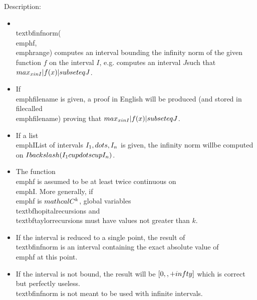 \noindent Description: \begin{itemize}

\item \\textbf{infnorm}(\\emph{f},\\emph{range}) computes an interval bounding the infinity norm of the \n   given function $f$ on the interval $I$, e.g. computes an interval $J$\n   such that $\\max_{x \\in I} \\{|f(x)|\\} \\subseteq J$.\n
\item If \\emph{filename} is given, a proof in English will be produced (and stored in file\n   called \\emph{filename}) proving that  $\\max_{x \\in I} \\{|f(x)|\\} \\subseteq J$.\n
\item If a list \\emph{IList} of intervals $I_1, \\dots, I_n$ is given, the infinity norm will\n   be computed on $I \\backslash (I_1 \\cup \\dots \\cup I_n)$.\n
\item The function \\emph{f} is assumed to be at least twice continuous on \\emph{I}. More \n   generally, if \\emph{f} is $\\mathcal{C}^k$, global variables \\textbf{hopitalrecursions} and\n   \\textbf{taylorrecursions} must have values not greater than $k$.  \n
\item If the interval is reduced to a single point, the result of \\textbf{infnorm} is an \n   interval containing the exact absolute value of \\emph{f} at this point.\n
\item If the interval is not bound, the result will be $[0,\\,+\\infty]$ \n   which is correct but perfectly useless. \\textbf{infnorm} is not meant to be used with \n   infinite intervals.\n

\end{itemize}
